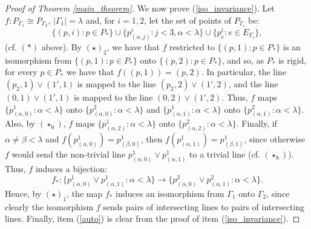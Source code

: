 \documentclass{amsart}
\numberwithin{claimcounter}{theorem}
\begin{document}
\begin{proof}[Proof of Theorem \ref{main_theorem}]
\smallskip
\noindent We now prove (\ref{iso_invariance}). Let $f: P_{\Gamma_1} \cong P_{\Gamma_2}$, $|\Gamma_1| = \lambda$ and, for $i = 1, 2$, let the set of points of $P_{\Gamma_i}$ be:
$$\{ (p, i) : p \in P_* \} \cup \{ p^i_{(\alpha, j)} : j < 3, \alpha < \lambda \} \cup \{ p^i_e : e \in E_{\Gamma_i} \},$$
(cf. $(*)$ above). By $(\star)_2$, we have that $f$ restricted to
$\{ (p, 1) : p \in P_* \}$ is an isomorphism from $\{ (p, 1) : p \in P_* \}$ onto $\{ (p, 2) : p \in P_* \}$, and so, as $P_*$ is rigid, for every $p \in P_*$ we have that $f((p, 1)) = (p, 2)$. In particular, the line $(p_2, 1) \vee (1', 1)$ is mapped to the line $(p_2, 2) \vee (1', 2)$, and the line $(0, 1) \vee (1', 1)$ is mapped to the line $(0, 2) \vee (1', 2)$. Thus,  $f$ maps $\{ p^1_{(\alpha, 0)} : \alpha < \lambda \}$ onto $\{ p^2_{(\alpha, 0)} : \alpha < \lambda \}$ and $\{ p^1_{(\alpha, 1)} : \alpha < \lambda \}$ onto $\{ p^2_{(\alpha, 1)} : \alpha < \lambda \}$.
Also, by $(\star_6)$, $f$ maps $\{ p^1_{(\alpha, 2)} : \alpha < \lambda \}$ onto $\{ p^2_{(\alpha, 2)} : \alpha < \lambda \}$. Finally, if  $\alpha \neq \beta < \lambda$ and $f(p^1_{(\alpha, 0)}) = p^1_{(\beta, 0)}$, then $f(p^1_{(\alpha, 1)}) = p^1_{(\beta, 1)}$, since otherwise $f$ would send the non-trivial line $p^1_{(\alpha, 0)} \vee p^1_{(\alpha, 1)}$ to a trivial line (cf. $(\star_8)$).  
Thus, $f$ induces a bijection:
$$f_* : \{ p^1_{(\alpha, 0)} \vee p^1_{(\alpha, 1)} : \alpha < \lambda \} \rightarrow \{ p^2_{(\alpha, 0)} \vee p^2_{(\alpha, 1)} : \alpha < \lambda \}.$$
Hence, by $(\star)_1$, the map $f_*$ induces an isomorphism from $\Gamma_1$ onto $\Gamma_2$, since clearly the isomorphism $f$ sends pairs of intersecting lines to pairs of intersecting lines. Finally, item (\ref{auto}) is clear from the proof of item (\ref{iso_invariance}).
\end{proof}
\end{document}
